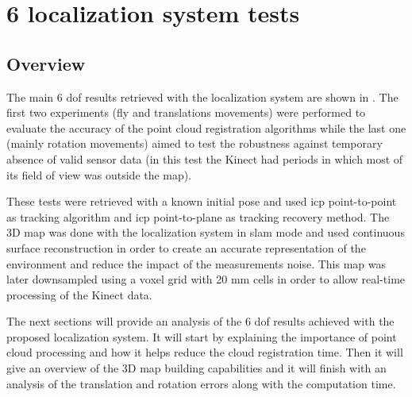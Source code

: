 
\section{6  localization system tests}\label{sec:tridimensional-localization-system-tests}

\subsection{Overview}

The main 6 \gls{dof} results retrieved with the localization system are shown in . The first two experiments (fly and translations movements) were performed to evaluate the accuracy of the point cloud registration algorithms while the last one (mainly rotation movements) aimed to test the robustness against temporary absence of valid sensor data (in this test the Kinect had periods in which most of its field of view was outside the map).

These tests were retrieved with a known initial pose and used \gls{icp} point-to-point as tracking algorithm and \gls{icp} point-to-plane as tracking recovery method. The 3D map was done with the localization system in \gls{slam} mode and used continuous surface reconstruction in order to create an accurate representation of the environment and reduce the impact of the measurements noise. This map was later downsampled using a voxel grid with 20 mm cells in order to allow real-time processing of the Kinect data.

The next sections will provide an analysis of the 6 \gls{dof} results achieved with the proposed localization system. It will start by explaining the importance of point cloud processing and how it helps reduce the cloud registration time. Then it will give an overview of the 3D map building capabilities and it will finish with an analysis of the translation and rotation errors along with the computation time.


